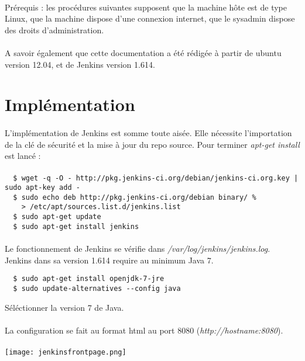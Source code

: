 \documentclass{article}
\begin{document}
\paragraph{}
Prérequis : les procédures suivantes supposent que la machine hôte est de type Linux, 
		que la machine dispose d'une connexion internet, 
		que le sysadmin dispose des droits d'administration.\\

\paragraph{}
A savoir également que cette documentation a été rédigée à partir de ubuntu version 12.04, et de Jenkins version 1.614.\\


\section{Implémentation}\label{implémentation}
\paragraph{}
L'implémentation de Jenkins est somme toute aisée. Elle nécessite l'importation de la clé de sécurité et la mise à jour du repo source. Pour terminer \textit{apt-get install} est lancé :

\paragraph{}

\begin{verbatim}
  $ wget -q -O - http://pkg.jenkins-ci.org/debian/jenkins-ci.org.key | sudo apt-key add -
  $ sudo echo deb http://pkg.jenkins-ci.org/debian binary/ % 
    > /etc/apt/sources.list.d/jenkins.list
  $ sudo apt-get update
  $ sudo apt-get install jenkins
\end{verbatim}

\paragraph{}
Le fonctionnement de Jenkins se vérifie dans \textit{/var/log/jenkins/jenkins.log}.\\
Jenkins dans sa version 1.614 require au minimum Java 7. \\
\begin{verbatim}
  $ sudo apt-get install openjdk-7-jre 
  $ sudo update-alternatives --config java
\end{verbatim}
Séléctionner la version 7 de Java.\\
\\
La configuration se fait au format html au port 8080 (\textit{http://hostname:8080}).\\
\\
\texttt{[image: jenkinsfrontpage.png]}
\end{document}
